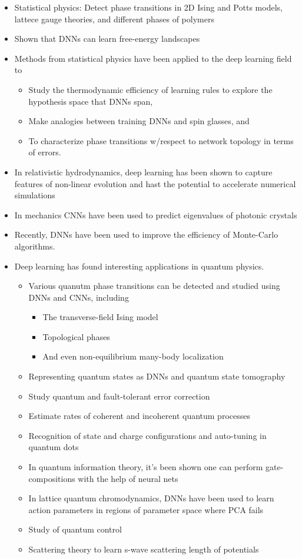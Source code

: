 \documentclass[norsk,a4paper,11pt]{article}
\begin{document}
\begin{itemize}
	\begin{itemize}
		\item Statistical physics: Detect phase transitions in 2D Ising and Potts models, lattece gauge theories, and different phases of polymers
		\item Shown that DNNs can learn free-energy landscapes
		\item Methods from statistical physics have been applied to the deep learning field to 
		\begin{itemize}
			\item Study the thermodynamic efficiency of learning rules to explore the hypothesis space that DNNs span, 
			\item Make analogies between training DNNs and spin glasses, and 
			\item To characterize phase transitions w/respect to network topology in terms of errors. 
		\end{itemize}
		\item In relativistic hydrodynamics, deep learning has been shown to capture features of non-linear evolution and hast the potential to accelerate numerical simulations
		\item In mechanics CNNs have been used to predict eigenvalues of photonic crystals
		\item Recently, DNNs have been used to improve the efficiency of Monte-Carlo algorithms.
		\item Deep learning has found interesting applications in quantum physics.
		\begin{itemize}
			\item Various quanutm phase transitions can be detected and studied using DNNs and CNNs, including 
			\begin{itemize}
				\item The transverse-field Ising model
				\item Topological phases
				\item And even non-equilibrium many-body localization
			\end{itemize}
			\item Representing quantum states as DNNs and quantum state tomography
			\item Study quantum and fault-tolerant error correction
			\item Estimate rates of coherent and incoherent quantum processes
			\item Recognition of state and charge configurations and auto-tuning in quantum dots
			\item In quantum information theory, it's been shown one can perform gate-compositions with the help of neural nets
			\item In lattice quantum chromodynamics, DNNs have been used to learn action parameters in regions of parameter space where PCA fails
			\item Study of quantum control
			\item Scattering theory to learn s-wave scattering length of potentials
		\end{itemize}
	\end{itemize}
\end{itemize}
\end{document}
